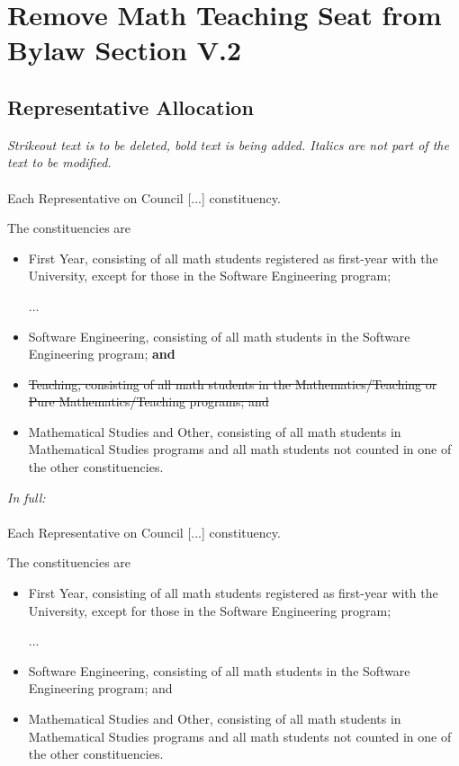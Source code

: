 \documentclass[12pt, letterpaper]{article}
\begin{document}
\newpage
{}
\section*{Remove Math Teaching Seat from Bylaw Section V.2}
\subsection*{Representative Allocation}
\textit{Strikeout text is to be deleted, bold text is being added. Italics are not part of the text to be modified.}\\\\
Each Representative on Council [...] constituency.

The constituencies are
\begin{itemize}
	\item First Year, consisting of all math students registered as first-year
	with the University, except for those in the Software Engineering program;
	\item [...]
	\item Software Engineering, consisting of all math students in the Software
	Engineering program; \textbf{and}
	\item \sout{Teaching, consisting of all math students in the
		Mathematics/Teaching or Pure Mathematics/Teaching programs;
		and}
	\item Mathematical Studies and Other, consisting of all math students in
	Mathematical Studies programs and all math students not counted in one of
	the other constituencies.
\end{itemize}
\emph{In full:}\\\\
Each Representative on Council [...] constituency.

The constituencies are
\begin{itemize}
	\item First Year, consisting of all math students registered as first-year
	with the University, except for those in the Software Engineering program;
	\item [...]
	\item Software Engineering, consisting of all math students in the Software
	Engineering program; and
	\item Mathematical Studies and Other, consisting of all math students in
	Mathematical Studies programs and all math students not counted in one of
	the other constituencies.
\end{itemize}
\end{document}
